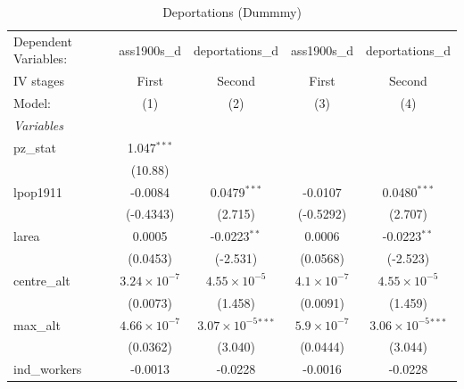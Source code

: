 
\begin{table}[htbp]
   \caption{Deportations (Dummmy)}
   \centering
   \begin{tabular}{lcccc}
      \tabularnewline \midrule \midrule
      Dependent Variables:             & ass1900s\_d           & deportations\_d               & ass1900s\_d          & deportations\_d\\   
      IV stages                        & First                 & Second                        & First                & Second \\   
      Model:                           & (1)                   & (2)                           & (3)                  & (4)\\  
      \midrule
      \emph{Variables}\\
      pz\_stat                         & 1.047$^{***}$         &                               &                      &   \\   
                                       & (10.88)               &                               &                      &   \\   
      lpop1911                         & -0.0084               & 0.0479$^{***}$                & -0.0107              & 0.0480$^{***}$\\   
                                       & (-0.4343)             & (2.715)                       & (-0.5292)            & (2.707)\\   
      larea                            & 0.0005                & -0.0223$^{**}$                & 0.0006               & -0.0223$^{**}$\\   
                                       & (0.0453)              & (-2.531)                      & (0.0568)             & (-2.523)\\   
      centre\_alt                      & $3.24\times 10^{-7}$  & $4.55\times 10^{-5}$          & $4.1\times 10^{-7}$  & $4.55\times 10^{-5}$\\    
                                       & (0.0073)              & (1.458)                       & (0.0091)             & (1.459)\\   
      max\_alt                         & $4.66\times 10^{-7}$  & $3.07\times 10^{-5}$$^{***}$  & $5.9\times 10^{-7}$  & $3.06\times 10^{-5}$$^{***}$\\    
                                       & (0.0362)              & (3.040)                       & (0.0444)             & (3.044)\\   
      ind\_workers                     & -0.0013               & -0.0228                       & -0.0016              & -0.0228\\   

\end{tabular}
\end{table}

